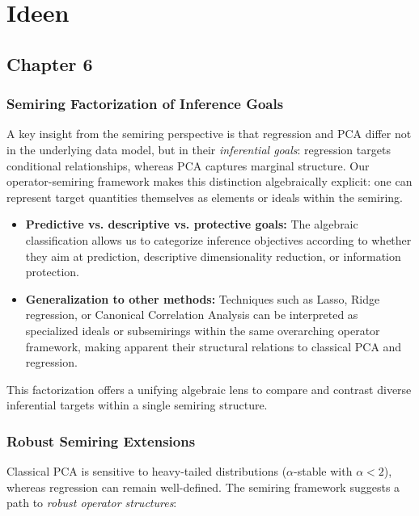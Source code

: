 \section{Ideen}

\subsection{Chapter 6}

\subsubsection{Semiring Factorization of Inference Goals}

A key insight from the semiring perspective is that regression and PCA differ not in the underlying data model, but in their \emph{inferential goals}: regression targets conditional relationships, whereas PCA captures marginal structure.  
Our operator-semiring framework makes this distinction algebraically explicit: one can represent target quantities themselves as elements or ideals within the semiring.  

\begin{itemize}
    \item \textbf{Predictive vs. descriptive vs. protective goals:} The algebraic classification allows us to categorize inference objectives according to whether they aim at prediction, descriptive dimensionality reduction, or information protection.
    \item \textbf{Generalization to other methods:} Techniques such as Lasso, Ridge regression, or Canonical Correlation Analysis can be interpreted as specialized ideals or subsemirings within the same overarching operator framework, making apparent their structural relations to classical PCA and regression.
\end{itemize}

This factorization offers a unifying algebraic lens to compare and contrast diverse inferential targets within a single semiring structure.

\subsubsection{Robust Semiring Extensions}

Classical PCA is sensitive to heavy-tailed distributions (\(\alpha\)-stable with \(\alpha<2\)), whereas regression can remain well-defined.  
The semiring framework suggests a path to \emph{robust operator structures}:

